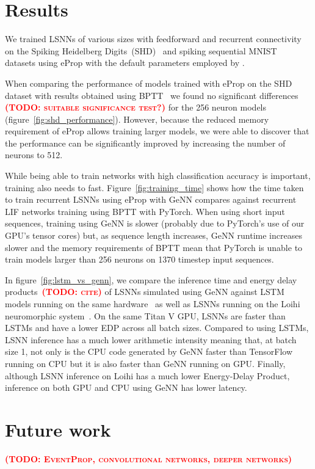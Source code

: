 \documentclass[sigconf,authordraft]{acmart}
\newcommand{\todo}[1]{\textbf{\textsc{\textcolor{red}{(TODO: #1)}}}}
\begin{document}
\section{Results}
We trained LSNNs of various sizes with feedforward and recurrent connectivity on the Spiking Heidelberg Digits~(SHD)~\citep{Cramer2020} and spiking sequential MNIST~\citep{Plank2021} datasets using eProp with the default parameters employed by \citet{Bellec2020}.

When comparing the performance of models trained with eProp on the SHD dataset with results obtained using BPTT~\citep{Zenke2021a} we found no significant differences \todo{suitable significance test?} for the \num{256} neuron models (figure~\ref{fig:shd_performance}). 
However, because the reduced memory requirement of eProp allows training larger models, we were  able to discover that the performance can be significantly improved by increasing the number of neurons to \num{512}.

While being able to train networks with high classification accuracy is important, training also needs to fast.
Figure~\ref{fig:training_time} shows how the time taken to train recurrent LSNNs using eProp with GeNN compares against recurrent LIF networks training using BPTT with PyTorch.
When using short input sequences, training using GeNN is slower (probably due to PyTorch's use of our GPU's tensor cores) but, as sequence length increases, GeNN runtime increases slower and the memory requirements of BPTT mean that PyTorch is unable to train models larger than \num{256} neurons on \num{1370} timestep input sequences.

In figure~\ref{fig:lstm_vs_genn}, we compare the inference time and energy delay products~\todo{cite} of LSNNs simulated using GeNN against LSTM models running on the same hardware~\citep{Plank2021} as well as LSNNs running on the Loihi neuromorphic system~\citep{Davies2018}.
On the same Titan V GPU, LSNNs are faster than LSTMs and have a lower EDP across all batch sizes.
Compared to using LSTMs, LSNN inference has a much lower arithmetic intensity meaning that, at batch size 1, not only is the CPU code generated by GeNN faster than TensorFlow running on CPU but it is also faster than GeNN running on GPU.
Finally, although LSNN inference on Loihi has a much lower Energy-Delay Product, inference on both GPU and CPU using GeNN has lower latency.

\section{Future work}
\todo{EventProp, convolutional networks, deeper networks}
\end{document}
